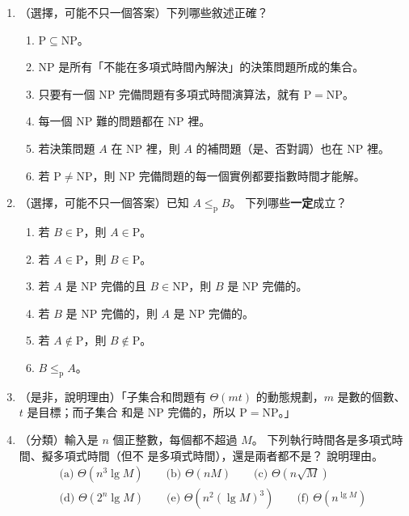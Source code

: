 \begin{enumerate}
\item （選擇，可能不只一個答案）下列哪些敘述正確？
\begin{enumerate}
\item $\mathrm{P} \subseteq \mathrm{NP}$。
\item NP 是所有「不能在多項式時間內解決」的決策問題所成的集合。
\item 只要有一個 NP 完備問題有多項式時間演算法，就有 $\mathrm{P} = \mathrm{NP}$。
\item 每一個 NP 難的問題都在 NP 裡。
\item 若決策問題 $A$ 在 NP 裡，則 $A$ 的補問題（是、否對調）也在 NP 裡。
\item 若 $\mathrm{P} \ne \mathrm{NP}$，則 NP 完備問題的每一個實例都要指數時間才能解。
\end{enumerate}

\item （選擇，可能不只一個答案）已知 $A \le_{\mathrm{p}} B$。 下列哪些\textbf{一定}成立？
\begin{enumerate}
\item 若 $B \in \mathrm{P}$，則 $A \in \mathrm{P}$。
\item 若 $A \in \mathrm{P}$，則 $B \in \mathrm{P}$。
\item 若 $A$ 是 NP 完備的且 $B \in \mathrm{NP}$，則 $B$ 是 NP 完備的。
\item 若 $B$ 是 NP 完備的，則 $A$ 是 NP 完備的。
\item 若 $A \notin \mathrm{P}$，則 $B \notin \mathrm{P}$。
\item $B \le_{\mathrm{p}} A$。
\end{enumerate}

\item （是非，說明理由）「子集合和問題有 $\Theta(mt)$ 的動態規劃，$m$ 是數的個數、$t$ 是目標；而子集合
和是 NP 完備的，所以 $\mathrm{P} = \mathrm{NP}$。」

\item （分類）輸入是 $n$ 個正整數，每個都不超過 $M$。 下列執行時間各是多項式時間、擬多項式時間（但不
是多項式時間），還是兩者都不是？ 說明理由。
\begin{gather*}
\text{(a) } \Theta(n^3 \lg M) \qquad \text{(b) } \Theta(nM) \qquad \text{(c) } \Theta(n\sqrt{M}) \\
\text{(d) } \Theta(2^n \lg M) \qquad \text{(e) } \Theta(n^2 (\lg M)^3) \qquad \text{(f) } \Theta(n^{\lg M})
\end{gather*}


\end{enumerate}
